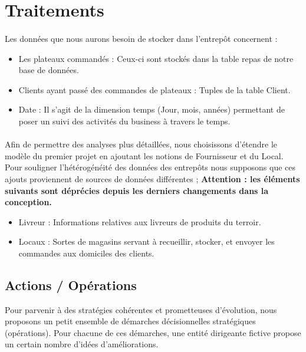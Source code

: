 \section{Traitements}

\paragraph{} Les données que nous aurons besoin de stocker dans l’entrepôt concernent : 

\begin{itemize}
    \item Les plateaux commandés : Ceux-ci sont stockés dans la table repas de notre base de données.
    \item Clients ayant passé des commandes de plateaux : Tuples de la table Client.
    \item Date : Il s’agit de la dimension temps (Jour, mois, années) permettant de poser un suivi des activités du business à travers le temps.
\end{itemize}

\paragraph{} Afin de permettre des analyses plus détaillées, nous choisissons d’étendre le modèle du premier projet en ajoutant les notions de Fournisseur et du Local. Pour souligner l’hétérogénéité des données des entrepôts nous supposons que ces ajouts proviennent de sources de données différentes ;
\newline
\textbf{Attention : les éléments suivants sont déprécies depuis les derniers changements dans la conception.}
\begin{itemize}
    \item Livreur : Informations relatives aux livreurs de produits du terroir.
    \item Locaux : Sortes de magasins servant à recueillir, stocker, et envoyer les commandes aux domiciles des clients.

\end{itemize}

\subsection{Actions / Opérations}
Pour parvenir à des stratégies cohérentes et prometteuses d’évolution, nous proposons un petit ensemble de démarches décisionnelles stratégiques (opérations). Pour chacune de ces démarches, une entité dirigeante fictive propose un certain nombre d’idées d’améliorations.

